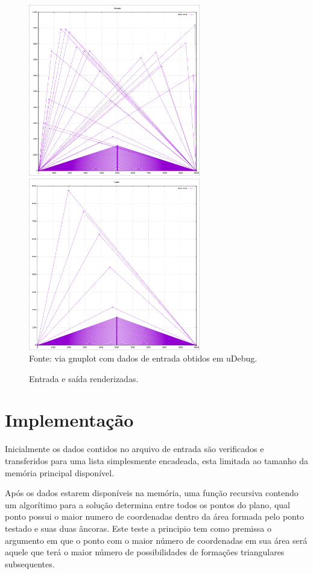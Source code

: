 \documentclass[12pt,a4paper]{article}
\begin{document}
\begin{figure}[!h]
	\caption{Entrada e saída renderizadas.}
	\vspace{5pt}
	\label{fig:inrend}
	\includegraphics[width=75mm]{input.png}
	\hfill
	\includegraphics[width=75mm]{output.png}\\
	\footnotesize Fonte: via gnuplot com dados de entrada obtidos em uDebug.\cite{uri:vitor}
\end{figure}

\section{Implementação}

Inicialmente os dados contidos no arquivo de entrada são verificados e transferidos para uma lista simplesmente encadeada, esta limitada ao tamanho da memória principal disponível.

Após os dados estarem disponíveis na memória, uma função recursiva contendo um algorítimo para a solução determina entre todos os pontos do plano, qual ponto possui o maior numero de coordenadas dentro da área formada pelo ponto testado e suas duas âncoras. Este teste a principio tem como premissa o argumento em que o ponto com o maior número de coordenadas em sua área será aquele que terá o maior número de possibilidades de formações triangulares subsequentes.
\end{document}
